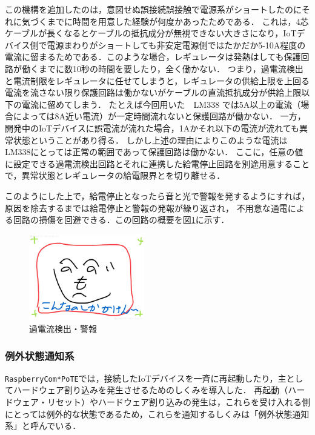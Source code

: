 この機構を追加したのは，意図せぬ誤接続誤接触で電源系がショートしたのにそれに気づくまでに時間を用意した経験が何度かあったためである．
これは，4芯ケーブルが長くなるとケーブルの抵抗成分が無視できない大きさになり，IoTデバイス側で電源まわりがショートしても非安定電源側ではたかだか5-10A程度の電流に留まるためである．このような場合，レギュレータは発熱はしても保護回路が働くまでに数10秒の時間を要したり，全く働かない．
つまり，過電流検出と電流制限をレギュレータに任せてしまうと，レギュレータの供給上限を上回る電流を流さない限り保護回路は働かないがケーブルの直流抵抗成分が供給上限以下の電流に留めてしまう．
たとえば今回用いた　LM338 では5A以上の電流（場合によっては8A近い電流）が一定時間流れないと保護回路が働かない．
一方，開発中のIoTデバイスに誤電流が流れた場合，1Aかそれ以下の電流が流れても異常状態ということがあり得る．
しかし上述の理由によりこのような電流はLM338にとっては正常の範囲であって保護回路は働かない．
ここに，任意の値に設定できる過電流検出回路とそれに連携した給電停止回路を別途用意することで，異常状態とレギュレータの給電限界とを切り離せる．

このようにした上で，給電停止となったら音と光で警報を発するようにすれば，原因を除去するまでは給電停止と警報の発報が繰り返され，
不用意な通電による回路の損傷を回避できる．この回路の概要を図\ref{hohno:RaspberryComPoTE-Po2}に示す．

\begin{figure}[H]
\centering
\includegraphics[width=5cm]{figspics/henoheno.jpeg}
\caption{過電流検出・警報}
\label{hohno:RaspberryComPoTE-Po2}
\end{figure}




\subsubsection{例外状態通知系}

 {\tt Raspberry\-Com*PoTE}では，接続したIoTデバイスを一斉に再起動したり，主としてハードウェア割り込みを発生させるためのしくみを導入した．
 再起動（ハードウェア・リセット）やハードウェア割り込みの発生は，これらを受け入れる側にとっては例外的な状態であるため，これらを通知するしくみは「例外状態通知系」と呼んでいる．


